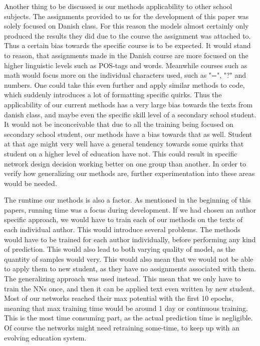 Another thing to be discussed is our methods applicability to other school
subjects. The assignments provided to us for the development of this paper was
solely focused on Danish class. For this reason the models almost certainly only
produced the results they did due to the course the assignment was attached to.
Thus a certain bias towards the specific course is to be expected. It would
stand to reason, that assignments made in the Danish course are more focused
on the higher linguistic levels such as POS-tags and words. Meanwhile courses
such as math would focus more on the individual characters used, such as "=",
"?" and numbers. One could take this even further and apply similar methods
to code, which suddenly introduces a lot of formatting specific quirks. Thus
the applicability of our current methods has a very large bias towards the
texts from danish class, and maybe even the specific skill level of a secondary
school student. It would not be inconceivable that due to all the training being
focused on secondary school student, our methods have a bias towards that as
well. Student at that age might very well have a general tendency towards some
quirks that student on a higher level of education have not. This could result
in specific network design decision working better on one group than another. In
order to verify how generalizing our methods are, further experimentation into
these areas would be needed.

The runtime our methods is also a factor. As mentioned in the beginning of this
papers, running time was a focus during development. If we had chosen an author
specific approach, we would have to train each of our methods on the texts of
each individual author. This would introduce several problems. The methods
would have to be trained for each author individually, before performing any
kind of prediction. This would also lead to both varying quality of model, as
the quantity of samples would very. This would also mean that we would not be
able to apply them to new student, as they have no assignments associated with
them. The generalizing approach was used instead. This mean that we only have
to train the \gls{NN}s once, and then it can be applied text even written by
new student. Most of our networks reached their max potential with the first
10 epochs, meaning that max training time would be around 1 day or continuous
training. This is the most time consuming part, as the actual prediction time is
negligible. Of course the networks might need retraining some-time, to keep up
with an evolving education system.

